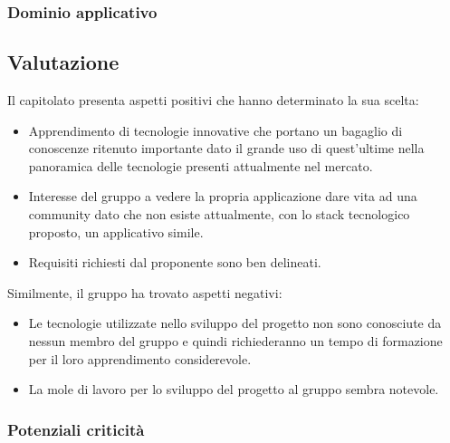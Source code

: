 	\subsubsection{Dominio applicativo}

\subsection{Valutazione}
\label{StudioDiFattibilità}
	Il capitolato presenta aspetti positivi che hanno determinato la sua scelta:
	\begin{itemize}
	\item Apprendimento di tecnologie innovative che portano un bagaglio di conoscenze ritenuto importante dato il grande uso di 	          		quest'ultime nella panoramica delle tecnologie presenti attualmente nel mercato.
	\item Interesse del gruppo a vedere la propria applicazione dare vita ad una community dato che non esiste attualmente, con lo 	       stack tecnologico proposto, un applicativo simile.
	\item Requisiti richiesti dal proponente sono ben delineati.
	\end{itemize}
Similmente, il gruppo ha trovato aspetti negativi:
	\begin{itemize}
	\item Le tecnologie utilizzate nello sviluppo del progetto non sono conosciute da nessun membro del gruppo \GroupName e
	quindi richiederanno un tempo di formazione per il loro apprendimento considerevole.
	\item La mole di lavoro per lo sviluppo del progetto al gruppo sembra notevole.
	\end{itemize}
	\subsubsection{Potenziali criticità}
	
	
